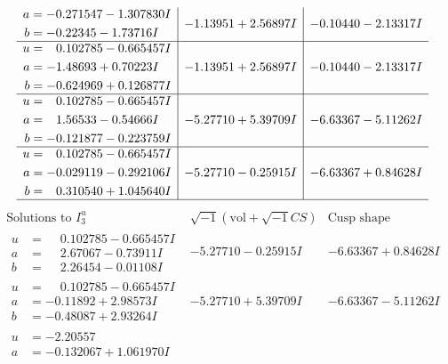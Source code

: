 \documentclass[1p]{elsarticle_modified}
\theoremstyle{definition}
\newcommand{\I}{\sqrt{-1}}
\begin{document}
$$\begin{array}{c|c|c}
\begin{aligned}
a &= -0.271547 - 1.307830 I \\
b &= -0.22345 - 1.73716 I\end{aligned}
 & -1.13951 + 2.56897 I & -0.10440 - 2.13317 I \\ \hline\begin{aligned}
u &= \phantom{-}0.102785 - 0.665457 I \\
a &= -1.48693 + 0.70223 I \\
b &= -0.624969 + 0.126877 I\end{aligned}
 & -1.13951 + 2.56897 I & -0.10440 - 2.13317 I \\ \hline\begin{aligned}
u &= \phantom{-}0.102785 - 0.665457 I \\
a &= \phantom{-}1.56533 - 0.54666 I \\
b &= -0.121877 - 0.223759 I\end{aligned}
 & -5.27710 + 5.39709 I & -6.63367 - 5.11262 I \\ \hline\begin{aligned}
u &= \phantom{-}0.102785 - 0.665457 I \\
a &= -0.029119 - 0.292106 I \\
b &= \phantom{-}0.310540 + 1.045640 I\end{aligned}
 & -5.27710 - 0.25915 I & -6.63367 + 0.84628 I\\
 \hline 
 \end{array}$$\newpage$$\begin{array}{c|c|c}  
\text{Solutions to }I^u_{3}& \I (\text{vol} + \sqrt{-1}CS) & \text{Cusp shape}\\
 \hline 
\begin{aligned}
u &= \phantom{-}0.102785 - 0.665457 I \\
a &= \phantom{-}2.67067 - 0.73911 I \\
b &= \phantom{-}2.26454 - 0.01108 I\end{aligned}
 & -5.27710 - 0.25915 I & -6.63367 + 0.84628 I \\ \hline\begin{aligned}
u &= \phantom{-}0.102785 - 0.665457 I \\
a &= -0.11892 + 2.98573 I \\
b &= -0.48087 + 2.93264 I\end{aligned}
 & -5.27710 + 5.39709 I & -6.63367 - 5.11262 I \\ \hline\begin{aligned}
u &= -2.20557\phantom{ +0.000000I} \\
a &= -0.132067 + 1.061970 I \\

\end{aligned}
\end{array}$$
\end{document}
